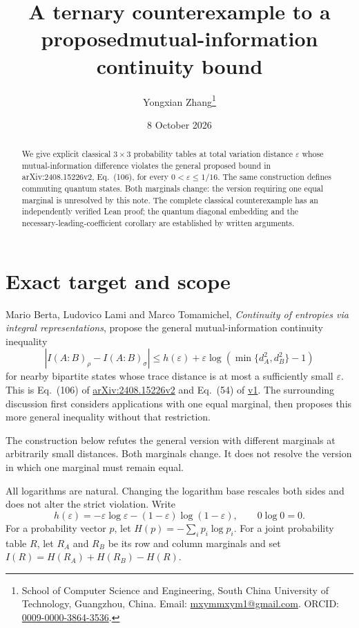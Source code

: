 \documentclass[11pt,a4paper]{article}
\title{A ternary counterexample to a proposed\newline mutual-information continuity bound}
\author{Yongxian Zhang\thanks{School of Computer Science and Engineering,
South China University of Technology, Guangzhou, China.
Email: \href{mailto:mxymmxym1@gmail.com}{mxymmxym1@gmail.com}.
ORCID: \href{https://orcid.org/0009-0000-3864-3536}{0009-0000-3864-3536}.}}
\date{8 October 2026}
\newcommand{\eps}{\varepsilon}
\begin{document}
\maketitle
\begin{abstract}
We give explicit classical $3\times3$ probability tables at total variation distance $\eps$ whose mutual-information difference violates the general proposed bound in arXiv:2408.15226v2, Eq.~(106), for every $0<\eps\le1/16$. The same construction defines commuting quantum states. Both marginals change: the version requiring one equal marginal is unresolved by this note. The complete classical counterexample has an independently verified Lean proof; the quantum diagonal embedding and the necessary-leading-coefficient corollary are established by written arguments.
\end{abstract}

\section{Exact target and scope}
Mario Berta, Ludovico Lami and Marco Tomamichel, \emph{Continuity of entropies via integral representations}, propose the general mutual-information continuity inequality
\begin{equation}\label{eq:target}
\left|I(A:B)_\rho-I(A:B)_\sigma\right|
\le h(\eps)+\eps\log\!\left(\min\{d_A^2,d_B^2\}-1\right)
\end{equation}
for nearby bipartite states whose trace distance is at most a sufficiently small $\eps$. This is Eq.~(106) of \href{https://arxiv.org/html/2408.15226v2\#S4}{arXiv:2408.15226v2} and Eq.~(54) of \href{https://arxiv.org/html/2408.15226v1\#S3.SS3}{v1}. The surrounding discussion first considers applications with one equal marginal, then proposes this more general inequality without that restriction.

The construction below refutes the general version with different marginals at arbitrarily small distances. Both marginals change. It does not resolve the version in which one marginal must remain equal.

All logarithms are natural. Changing the logarithm base rescales both sides
and does not alter the strict violation. Write
\begin{equation}
h(\eps)=-\eps\log\eps-(1-\eps)\log(1-\eps),\qquad 0\log0=0.
\end{equation}
For a probability vector $p$, let $H(p)=-\sum_i p_i\log p_i$. For a joint probability table $R$, let $R_A$ and $R_B$ be its row and column marginals and set $I(R)=H(R_A)+H(R_B)-H(R)$.
\end{document}
